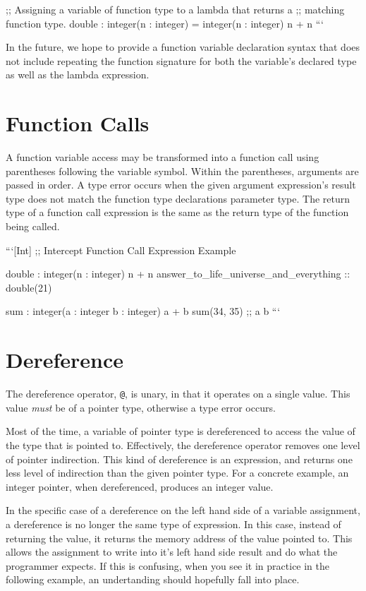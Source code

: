 \documentclass[12pt]{report}
\begin{document}
;; Assigning a variable of function type to a lambda that returns a
;; matching function type.
double : integer(n : integer) = integer(n : integer) {
  n + n
}
```

In the future, we hope to provide a function variable declaration syntax that does not include repeating the function signature for both the variable's declared type as well as the lambda expression.

\section{Function Calls}
\label{sec:expressions-function_calls}

A function variable access may be transformed into a function call using parentheses following the variable symbol. Within the parentheses, arguments are passed in order. A type error occurs when the given argument expression's result type does not match the function type declarations parameter type. The return type of a function call expression is the same as the return type of the function being called.

```[Int]
;; Intercept Function Call Expression Example

double : integer(n : integer) {
  n + n
}
answer_to_life_universe_and_everything :: double(21)

sum : integer(a : integer b : integer) {
  a + b
}
sum(34, 35)
;;  a   b
```

\section{Dereference}
\label{sec:expressions-dereference}

The dereference operator, \verb|@|, is unary, in that it operates on a single value. This value \emph{must} be of a pointer type, otherwise a type error occurs.

Most of the time, a variable of pointer type is dereferenced to access the value of the type that is pointed to. Effectively, the dereference operator removes one level of pointer indirection. This kind of dereference is an expression, and returns one less level of indirection than the given pointer type. For a concrete example, an integer pointer, when dereferenced, produces an integer value.

In the specific case of a dereference on the left hand side of a variable assignment, a dereference is no longer the same type of expression. In this case, instead of returning the value, it returns the memory address of the value pointed to. This allows the assignment to write into it's left hand side result and do what the programmer expects. If this is confusing, when you see it in practice in the following example, an undertanding should hopefully fall into place.
\end{document}
